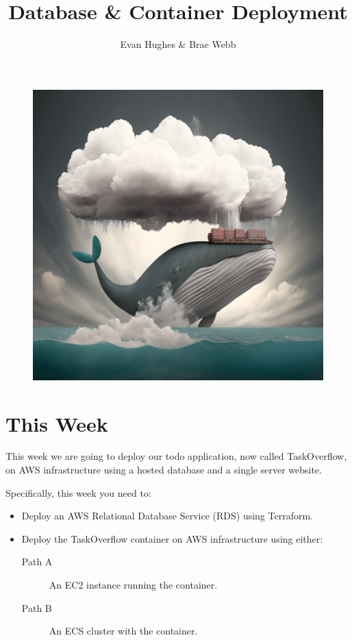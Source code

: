 \documentclass{csse4400}
\title{Database \& Container Deployment}
\author{Evan Hughes \& Brae Webb}
\date{\week[practical]{5}}
\begin{document}
\maketitle

\begin{figure}[h]
  \begin{center}
    \includegraphics[scale=0.4]{images/cloud-whale}
  \end{center}
\end{figure}

\section{This Week}
This week we are going to deploy our todo application,
now called TaskOverflow,
on AWS infrastructure using a hosted database and a single server website.

Specifically, this week you need to:
\begin{itemize}
    \item Deploy an AWS Relational Database Service (RDS) using Terraform.
    \item Deploy the TaskOverflow container on AWS infrastructure using either:
    \begin{description}
    \item [Path A] An EC2 instance running the container.
    \item [Path B] An ECS cluster with the container.
    \end{description}
\end{itemize}
\end{document}
